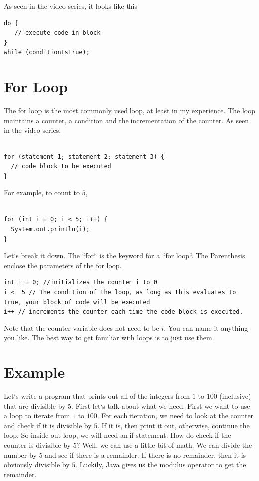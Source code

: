 \documentclass[11]{article}
\begin{document}
As seen in the video series, it looks like this

\begin{lstlisting}
do {
   // execute code in block
}
while (conditionIsTrue);
\end{lstlisting}
\section{For Loop}
The for loop is the most commonly used loop, at least in my experience. The loop maintains a counter, a condition and the incrementation of the counter. As seen in the video series, 
\begin{lstlisting}

for (statement 1; statement 2; statement 3) {
  // code block to be executed
}
\end{lstlisting}

For example, to count to $5$, 

\begin{lstlisting}

for (int i = 0; i < 5; i++) {
  System.out.println(i);
}
\end{lstlisting}

Let`s break it down. The ``for`` is the keyword for a ``for loop``. The Parenthesis enclose the parameters of the for loop.
\begin{lstlisting}
int i = 0; //initializes the counter i to 0
i <  5 // The condition of the loop, as long as this evaluates to true, your block of code will be executed
i++ // increments the counter each time the code block is executed.
\end{lstlisting}

Note that the counter variable does not need to be $i$. You can name it anything you like. The best way to get familiar with loops is to just use them.

\section{Example}
Let`s write a program that prints out all of the integers from $1$ to $100$ (inclusive) that are divisible by 5. First let`s talk about what we need. First we want to use a loop to iterate from $1$ to $100$. For each iteration, we need to look at the counter and check if it is divisible by $5$. If it is, then print it out, otherwise, continue the loop. So inside out loop, we will need an if-statement. How do check if the counter is divisible by $5$? Well, we can use a little bit of math. We can divide the number by $5$ and see if there is a remainder. If there is no remainder, then it is obviously divisible by $5$. Luckily, Java gives us the modulus operator to get the remainder. 
\end{document}
